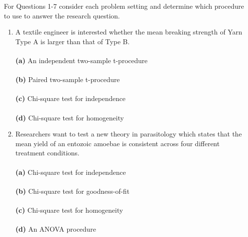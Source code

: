 \documentclass[12pt]{article}
\begin{document}
\noindent For Questions 1-7 consider each problem setting and determine which procedure to use to answer the research question. 

\begin{enumerate}[leftmargin=\labelsep]

\item A textile engineer is interested whether the mean breaking strength of Yarn Type A is larger than that of Type B. \\ \vspace{1mm}\\
{\bf (a)} \hspace{2mm} An independent two-sample t-procedure\\  \vspace{1mm}\\
{\bf (b)} \hspace{2mm} Paired two-sample t-procedure\\   \vspace{1mm}\\
{\bf (c)} \hspace{2mm} Chi-square test for independence\\  \vspace{1mm}\\
{\bf (d)} \hspace{2mm} Chi-square test for homogeneity\\

\item Researchers want to test a new theory in parasitology which states that the mean yield of an entozoic amoebae is consistent across four different treatment conditions.\\ \vspace{1mm}\\
{\bf (a)} \hspace{2mm} Chi-square test for independence\\ \vspace{1mm}\\
{\bf (b)} \hspace{2mm} Chi-square test for goodness-of-fit\\   \vspace{1mm}\\
{\bf (c)} \hspace{2mm} Chi-square test for homogeneity\\  \vspace{1mm}\\
{\bf (d)} \hspace{2mm} An ANOVA procedure\\  


\end{enumerate}
\end{document}
